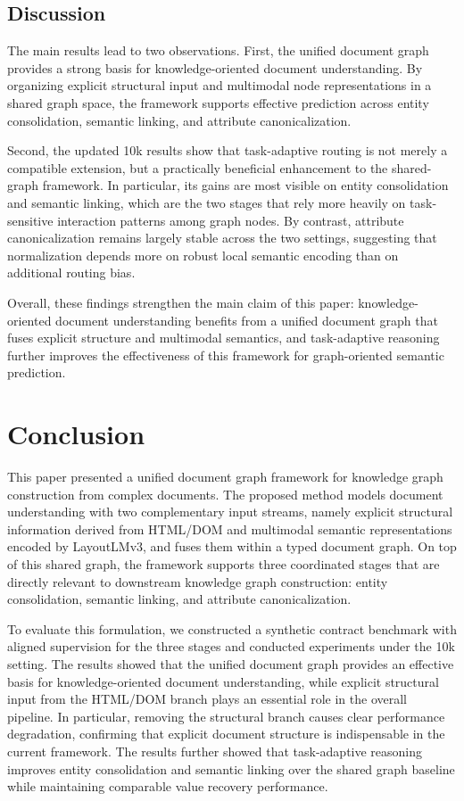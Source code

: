 \documentclass[pdflatex,twocolumn,iicol,sn-vancouver-num]{sn-jnl}%
\theoremstyle{thmstyleone}%
\theoremstyle{thmstyletwo}%
\theoremstyle{thmstylethree}%
\begin{document}
\subsection{Discussion}

The main results lead to two observations. First, the unified document graph provides a strong basis for knowledge-oriented document understanding. By organizing explicit structural input and multimodal node representations in a shared graph space, the framework supports effective prediction across entity consolidation, semantic linking, and attribute canonicalization.

Second, the updated 10k results show that task-adaptive routing is not merely a compatible extension, but a practically beneficial enhancement to the shared-graph framework. In particular, its gains are most visible on entity consolidation and semantic linking, which are the two stages that rely more heavily on task-sensitive interaction patterns among graph nodes. By contrast, attribute canonicalization remains largely stable across the two settings, suggesting that normalization depends more on robust local semantic encoding than on additional routing bias.

Overall, these findings strengthen the main claim of this paper: knowledge-oriented document understanding benefits from a unified document graph that fuses explicit structure and multimodal semantics, and task-adaptive reasoning further improves the effectiveness of this framework for graph-oriented semantic prediction.



\section{Conclusion}

This paper presented a unified document graph framework for knowledge graph construction from complex documents. The proposed method models document understanding with two complementary input streams, namely explicit structural information derived from HTML/DOM and multimodal semantic representations encoded by LayoutLMv3, and fuses them within a typed document graph. On top of this shared graph, the framework supports three coordinated stages that are directly relevant to downstream knowledge graph construction: entity consolidation, semantic linking, and attribute canonicalization.

To evaluate this formulation, we constructed a synthetic contract benchmark with aligned supervision for the three stages and conducted experiments under the 10k setting. The results showed that the unified document graph provides an effective basis for knowledge-oriented document understanding, while explicit structural input from the HTML/DOM branch plays an essential role in the overall pipeline. In particular, removing the structural branch causes clear performance degradation, confirming that explicit document structure is indispensable in the current framework. The results further showed that task-adaptive reasoning improves entity consolidation and semantic linking over the shared graph baseline while maintaining comparable value recovery performance.
\end{document}
